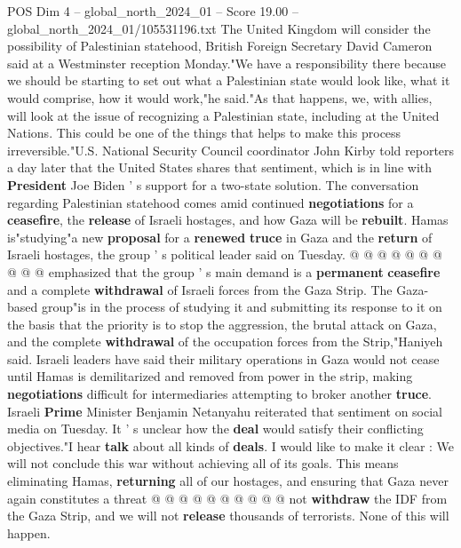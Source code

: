 \begin{textsample}{POS Dim 4 – global\_north\_2024\_01 – Score 19.00 – global\_north\_2024\_01/105531196.txt}  \label{ex:f4_pos_344}
The United Kingdom will consider the possibility of Palestinian statehood, British Foreign Secretary David Cameron said at a Westminster reception Monday."We have a responsibility there because we should be starting to set out what a Palestinian state would look like, what it would comprise, how it would work,"he said."As that happens, we, with allies, will look at the issue of recognizing a Palestinian state, including at the United Nations.
This could be one of the things that helps to make this process irreversible."U.S.
National Security Council coordinator John Kirby told reporters a day later that the United States shares that sentiment, which is in line with \textbf{President} Joe Biden ' s support for a two-state solution.
The conversation regarding Palestinian statehood comes amid continued \textbf{negotiations} for a \textbf{ceasefire}, the \textbf{release} of Israeli hostages, and how Gaza will be \textbf{rebuilt}.
Hamas is"studying"a new \textbf{proposal} for a \textbf{renewed} \textbf{truce} in Gaza and the \textbf{return} of Israeli hostages, the group ' s political leader said on Tuesday. @ @ @ @ @ @ @ @ @ @ emphasized that the group ' s main demand is a \textbf{permanent} \textbf{ceasefire} and a complete \textbf{withdrawal} of Israeli forces from the Gaza Strip.
The Gaza-based group"is in the process of studying it and submitting its response to it on the basis that the priority is to stop the aggression, the brutal attack on Gaza, and the complete \textbf{withdrawal} of the occupation forces from the Strip,"Haniyeh said.
Israeli leaders have said their military operations in Gaza would not cease until Hamas is demilitarized and removed from power in the strip, making \textbf{negotiations} difficult for intermediaries attempting to broker another \textbf{truce}.
Israeli \textbf{Prime} Minister Benjamin Netanyahu reiterated that sentiment on social media on Tuesday.
It ' s unclear how the \textbf{deal} would satisfy their conflicting objectives."I hear \textbf{talk} about all kinds of \textbf{deals}.
I would like to make it clear : We will not conclude this war without achieving all of its goals.
This means eliminating Hamas, \textbf{returning} all of our hostages, and ensuring that Gaza never again constitutes a threat @ @ @ @ @ @ @ @ @ @ not \textbf{withdraw} the IDF from the Gaza Strip, and we will not \textbf{release} thousands of terrorists.
None of this will happen.

\end{textsample}
